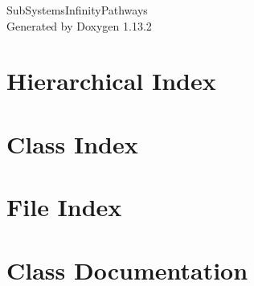\documentclass[twoside]{book}
\newcommand{\+}{\discretionary{\mbox{\scriptsize$\hookleftarrow$}}{}{}}
\newcommand{\clearemptydoublepage}{%
    \newpage{\pagestyle{empty}\cleardoublepage}%
  }
\begin{document}
  \raggedbottom
    \hypersetup{pageanchor=false,
                bookmarksnumbered=true,
                pdfencoding=unicode
               }
  \begin{titlepage}
  \vspace*{7cm}
  \begin{center}%
  {\Large Sub\+Systems\+Infinity\+Pathways}\\
  \vspace*{1cm}
  {\large Generated by Doxygen 1.13.2}\\
  \end{center}
  \end{titlepage}
  \clearemptydoublepage
  \tableofcontents
  \clearemptydoublepage
  \hypersetup{pageanchor=true}
\chapter{Hierarchical Index}

\chapter{Class Index}

\chapter{File Index}

\chapter{Class Documentation}






















\end{document}
